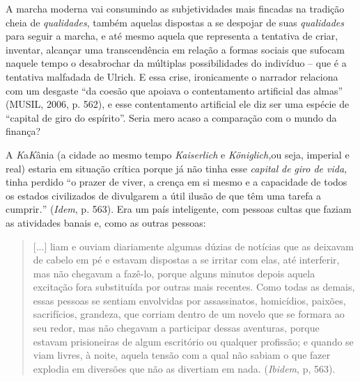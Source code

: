 A marcha moderna vai consumindo as subjetividades mais fincadas na
tradição cheia de \emph{qualidades}, também aquelas dispostas a se
despojar de suas \emph{qualidades} para seguir a marcha, e até mesmo
aquela que representa a tentativa de criar, inventar, alcançar uma
transcendência em relação a formas sociais que sufocam naquele tempo o
desabrochar da múltiplas possibilidades do indivíduo -- que é a
tentativa malfadada de Ulrich. E essa crise, ironicamente o narrador
relaciona com um desgaste ``da coesão que apoiava o contentamento
artificial das almas'' (MUSIL, 2006, p. 562), e esse contentamento
artificial ele diz ser uma espécie de ``capital de giro do espírito''.
Seria mero acaso a comparação com o mundo da finança?

A \emph{K}a\emph{K}ânia (a cidade ao mesmo tempo \emph{Kaiserlich} e
\emph{Königlich,}ou seja, imperial e real) estaria em situação crítica
porque já não tinha esse \emph{capital} \emph{de} \emph{giro de vida,}
tinha perdido ``o prazer de viver, a crença em si mesmo e a capacidade
de todos os estados civilizados de divulgarem a útil ilusão de que têm
uma tarefa a cumprir\emph{.}'' (\emph{Idem}, p. 563). Era um país
inteligente, com pessoas cultas que faziam as atividades banais e, como
as outras pessoas:

\begin{quote}
{[}...{]} liam e ouviam diariamente algumas dúzias de notícias que as
deixavam de cabelo em pé e estavam dispostas a se irritar com elas, até
interferir, mas não chegavam a fazê-lo, porque alguns minutos depois
aquela excitação fora substituída por outras mais recentes. Como todas
as demais, essas pessoas se sentiam envolvidas por assassinatos,
homicídios, paixões, sacrifícios, grandeza, que corriam dentro de um
novelo que se formara ao seu redor, mas não chegavam a participar dessas
aventuras, porque estavam prisioneiras de algum escritório ou qualquer
profissão; e quando se viam livres, à noite, aquela tensão com a qual
não sabiam o que fazer explodia em diversões que não as divertiam em
nada. (\emph{Ibidem}, p, 563).
\end{quote}

